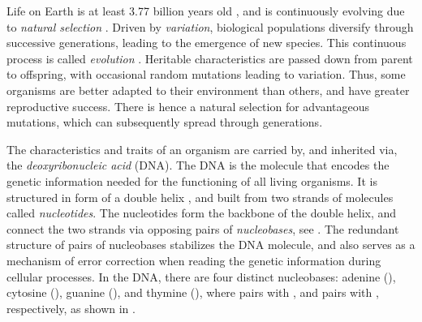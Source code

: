 
Life on Earth is at least 3.77 billion years old \cite{Dodd2017},
and is continuously evolving due to \emph{natural selection} \cite{Darwin1859}.
Driven by \emph{variation}, biological populations diversify through successive generations,
leading to the emergence of new species.
This continuous process is called \emph{evolution} \cite{Hall2008}.
Heritable characteristics are passed down from parent to offspring,
with occasional random mutations leading to variation.
Thus, some organisms are better adapted to their environment than others,
and have greater reproductive success.
There is hence a natural selection for advantageous mutations,
which can subsequently spread through generations.


The characteristics and traits of an organism are carried by, and inherited via, the \emph{deoxyribonucleic acid} (DNA).
The \ac{DNA} is the molecule that encodes the genetic information needed for the functioning of all living organisms.
It is structured in form of a double helix \cite{Watson1953},
and built from two strands of molecules called \emph{nucleotides}.
The nucleotides form the backbone of the double helix,
and connect the two strands via opposing pairs of \emph{nucleobases}, see .
The redundant structure of pairs of nucleobases stabilizes the \ac{DNA} molecule,
and also serves as a mechanism of error correction when reading the genetic information during cellular processes.
In the \ac{DNA}, there are four distinct nucleobases:
adenine (), cytosine (), guanine (), and thymine (),
where  pairs with , and  pairs with , respectively,
as shown in .

